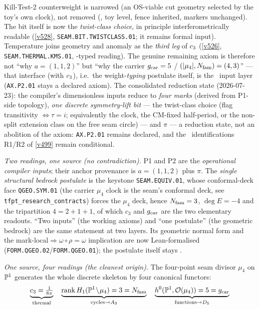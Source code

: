 Kill-Test-2 counterweight is narrowed (an OS-viable cut geometry selected by the toy's own
clock), not removed (, toy level, fence inherited,
markers unchanged). The bit itself is now the \emph{twist-class choice}, in principle
interferometrically readable (\vref{v528}, \texttt{SEAM.BIT.TWISTCLASS.01}; it remains formal
input). Temperature joins geometry and anomaly as the \emph{third leg} of $c_3$
(\vref{v526}, \texttt{SEAM.THERMAL.KMS.01}, \mC-typed reading).
The genuine remaining axiom is therefore not ``why $a=(1,1,2)$'' but ``why the carrier
$g_{\mathrm{car}}=5$ / $(|\mu_4|,N_{\mathrm{fam}})=(4,3)$'' --- that interface (with $c_3$), i.e.\ the weight-\emph{typing}
postulate itself, is the \mO\ input layer (\texttt{AX.P2.01} stays a declared axiom). The consolidated
reduction state (2026-07-23): the compiler's dimensionless inputs reduce to \emph{four marks} (derived
from P1-side topology), \emph{one discrete symmetry-lift bit} --- the twist-class choice (flag
transitivity $\iff\tau=i$; equivalently the clock, the CM-fixed half-period, or the non-split
extension class on the free seam circle) --- and $\pi$ --- a reduction state, not an abolition of the axiom:
\texttt{AX.P2.01} remains declared, and the \mC\
identifications R1/R2 of \vref{v499} remain conditional.
\par\smallskip
\noindent\emph{Two readings, one source (no contradiction).} P1 and P2 are the \emph{operational compiler
inputs}; their anchor provenance is $a=(1,1,2)$ plus $\pi$. The \emph{single structural bedrock postulate}
is the keystone \texttt{SEAM.EQUIV.01}, whose conformal-deck face \texttt{QGEO.SYM.01} (the carrier $\mu_4$
clock is the seam's conformal deck, see
\texttt{tfpt\_research\_contracts}) forces the $\mu_4$ deck, hence $N_{\mathrm{fam}}=3$, $\deg E=-4$ and the
tripartition $4=2{+}1{+}1$, of which $c_3$ and $g_{\mathrm{car}}$ are the two elementary readouts. ``Two inputs''
(the working axioms) and ``one postulate'' (the geometric bedrock) are the same statement at two layers.
Its geometric normal form and the mark-local$\Rightarrow\omega\circ\rho=\omega$ implication are now
Lean-formalised (\texttt{FORM.QGEO.02}/\texttt{FORM.QGEO.01}); the postulate itself stays \mO.
\par\smallskip
\noindent\emph{One source, four readings (the cleanest origin).} The four-point seam divisor $\mu_4$ on
$\mathbb{P}^1$ generates the whole discrete skeleton by four canonical functors:
\[
  \underbrace{c_3=\tfrac1{8\pi}}_{\text{thermal}}
  \quad
  \underbrace{\operatorname{rank}H_1(\mathbb{P}^1\!\setminus\!\mu_4)=3=N_{\mathrm{fam}}}_{\text{cycles}\to A_3}
  \quad
  \underbrace{h^0(\mathbb{P}^1,\mathcal O(\mu_4))=5=g_{\mathrm{car}}}_{\text{functions}\to D_5}
\]
